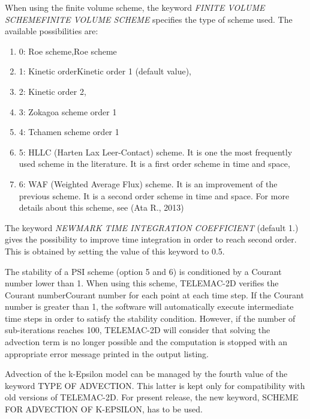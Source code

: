 \documentclass{article} %
\begin{document}
 When using the finite volume scheme, the keyword \textit{FINITE VOLUME SCHEMEFINITE VOLUME SCHEME} specifies the type of scheme used. The available possibilities are:

\begin{enumerate}
\item  0: Roe scheme,Roe scheme

\item  1: Kinetic orderKinetic order 1 (default value),

\item  2: Kinetic order 2,

\item  3: Zokagoa scheme order 1

\item  4: Tchamen scheme order 1

\item  5: HLLC (Harten Lax Leer-Contact) scheme. It is one the most frequently used scheme in the literature. It is a first order scheme in time and space,

\item  6: WAF (Weighted Average Flux) scheme. It is an improvement of the previous scheme. It is a second order scheme in time and space. For more details about this scheme, see (Ata R., 2013)
\end{enumerate}

 The keyword \textit{NEWMARK TIME INTEGRATION COEFFICIENT} (default 1.) gives the possibility to improve time integration in order to reach second order. This is obtained by setting the value of this keyword to 0.5.

 The stability of a PSI scheme (option 5 and 6) is conditioned by a Courant number lower than 1. When using this scheme, TELEMAC-2D verifies the Courant numberCourant number for each point at each time step. If the Courant number is greater than 1, the software will automatically execute intermediate time steps in order to satisfy the stability condition. However, if the number of sub-iterations reaches 100, TELEMAC-2D will consider that solving the advection term is no longer possible and the computation is stopped with an appropriate error message printed in the output listing.

 Advection of the k-Epsilon model can be managed by the fourth value of the keyword TYPE OF ADVECTION. This latter is kept only for compatibility with old versions of TELEMAC-2D. For present release, the new keyword, SCHEME FOR ADVECTION OF K-EPSILON, has to be used.
\end{document}
